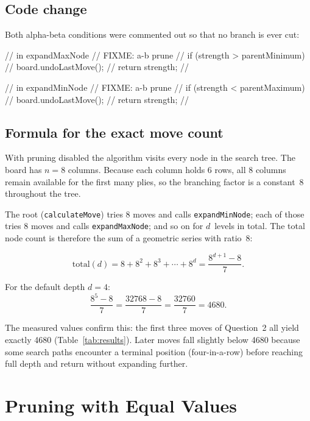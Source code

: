 \documentclass[language=english,titlepage=false,smartquotes=true]{hgbreport}
\begin{document}
\subsection{Code change}

Both alpha-beta conditions were commented out so that no branch is ever cut:

\begin{JavaCode}[numbers=none]
// in expandMaxNode
// FIXME: a-b prune
// if (strength > parentMinimum) {
//   board.undoLastMove();
//   return strength;
// }

// in expandMinNode
// FIXME: a-b prune
// if (strength < parentMaximum) {
//   board.undoLastMove();
//   return strength;
// }
\end{JavaCode}

\subsection{Formula for the exact move count}

With pruning disabled the algorithm visits every node in the search tree. The
board has $n = 8$ columns. Because each column holds 6 rows, all 8 columns
remain available for the first many plies, so the branching factor is a
constant~8 throughout the tree.

The root (\texttt{calculateMove}) tries 8 moves and calls
\texttt{expandMinNode}; each of those tries 8 moves and calls
\texttt{expandMaxNode}; and so on for $d$~levels in total. The total node
count is therefore the sum of a geometric series with ratio~8:

\begin{equation}
  \text{total}(d)
    = 8 + 8^{2} + 8^{3} + \cdots + 8^{d}
    = \frac{8^{d+1} - 8}{7}.
  \label{eq:formula}
\end{equation}

For the default depth $d = 4$:
\[
  \frac{8^{5} - 8}{7} = \frac{32768 - 8}{7} = \frac{32760}{7} = 4680.
\]

The measured values confirm this: the first three moves of Question~2 all
yield exactly 4680 (Table~\ref{tab:results}). Later moves fall slightly below
4680 because some search paths encounter a terminal position (four-in-a-row)
before reaching full depth and return without expanding further.

\section{Pruning with Equal Values}
\end{document}
